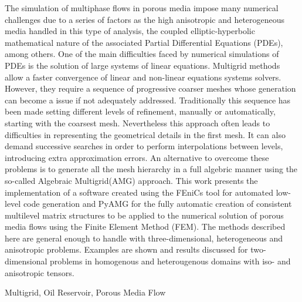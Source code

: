 The simulation of multiphase flows in porous media impose many numerical challenges due to a series of factors as the high anisotropic and heterogeneous media handled in this type of analysis, the coupled elliptic-hyperbolic mathematical nature of the associated Partial Differential Equations (PDEs),  among others. One of the main difficulties faced by numerical simulations of PDEs is the solution of large systems of linear equations. Multigrid methods allow a faster convergence of linear and non-linear equations systems solvers. However, they require a sequence of progressive coarser meshes whose generation can become a issue if not adequately addressed. Traditionally this sequence has been made setting different levels of refinement, manually or automatically, starting with the coarsest mesh. Nevertheless this approach often leads to difficulties in representing the geometrical details in the first mesh. It can also demand successive searches in order to perform interpolations between levels, introducing extra approximation errors. An alternative to overcome these problems is to generate all the mesh hierarchy in a full algebric manner using the so-called Algebraic Multigrid(AMG) approach. This work presents the implementation of a software created using the FEniCs tool for automated low-level code generation and PyAMG for the fully automatic creation of consistent multilevel matrix structures to be applied to the numerical solution of porous media flows using the Finite Element Method (FEM). The methods described here are general enough to handle with three-dimensional, heterogeneous and anisotropic problems. Examples are shown and results discussed for two-dimensional problems in homogenous and heterougenous domains with iso- and anisotropic tensors.

\begin{keywords}
Multigrid, Oil Reservoir, Porous Media Flow
\end{keywords}
